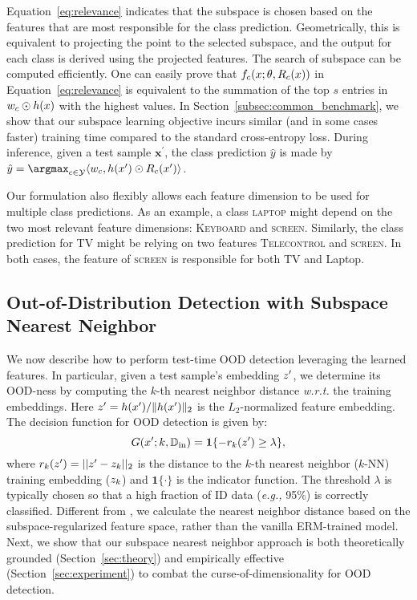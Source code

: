 Equation~\ref{eq:relevance} indicates that the subspace is chosen based on the features that are most responsible for the class prediction. 
Geometrically, this is equivalent to projecting 
the point to the selected subspace, and the output for each class is derived using
the projected features. The search of subspace can be computed efficiently. One can easily prove that $f_c(\*x;\theta, R_c(\*x))$ in Equation~\ref{eq:relevance} is equivalent to the summation of the top $s$ entries in 
$\*w_c \odot h(\*x)$ with the highest values. In Section~\ref{subsec:common_benchmark}, we show that our subspace learning objective incurs similar (and in some cases faster) training time compared to the standard cross-entropy loss. During inference, given a test sample $\mathbf{x}^{\prime}$, the class prediction $\hat{y}$ is made by $
    \hat{y}  = \argmax_{c \in \mathcal{Y}} \langle \*w_c, h(\*x^{\prime}) \odot R_c(\*x^{\prime}) \rangle $.


Our formulation also flexibly allows each feature dimension to be used for multiple class predictions. As an example, a class \textsc{laptop} might depend on the two most relevant feature dimensions: \textsc{Keyboard}  and \textsc{screen}. Similarly, the class prediction for \textsc{TV} might be relying on two features \textsc{Telecontrol}  and \textsc{screen}. In both cases, the feature of \textsc{screen} is
responsible for both TV and Laptop. 

\subsection{Out-of-Distribution Detection with Subspace Nearest Neighbor}
\label{sec:test}

We now describe how to perform test-time OOD detection leveraging the learned features.
In particular, given a test sample's embedding $\*z'$,  we determine its OOD-ness by computing the  $k$-th nearest neighbor distance \textit{w.r.t.} the training embeddings.  Here $\*z'= h(\*x') / \lVert h(\*x') \rVert_2$ is the $L_2$-normalized feature embedding. The decision function for OOD detection is given by: 
\begin{equation*}
    G(\*x';k, \mathbb{D}_\text{in}) = \mathbf{1}\{-r_k(\*z') \ge \lambda\},
\end{equation*} 
where $r_k(\*z') = ||\*z' - \*z_{k}||_2$ is the  distance to the $k$-th nearest neighbor ($k$-NN) training embedding ($\*z_k$) and $\mathbf{1}\{\cdot\}$ is the indicator function. The threshold $\lambda$ is typically chosen so that a high fraction of ID data (\emph{e.g.,} 95\%) is correctly classified. Different from \citet{sun2022knn}, we calculate the nearest neighbor distance based on the subspace-regularized feature space, rather than the vanilla ERM-trained model. Next, we  show that our subspace nearest neighbor approach is both theoretically grounded (Section~\ref{sec:theory}) and empirically effective (Section~\ref{sec:experiment}) to combat the curse-of-dimensionality for OOD detection.


